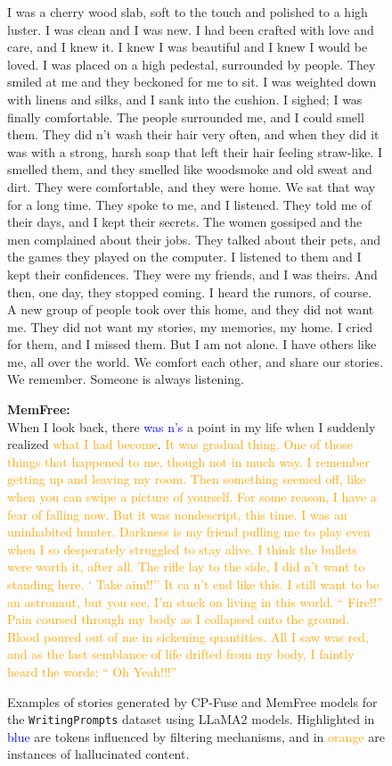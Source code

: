 \begin{figure}[!htbp]
\begin{mdframed}
\begin{minipage}[t]{\textwidth}
I was a cherry wood slab, soft to the touch and polished to a high luster. I was clean and I was new. I had been crafted with love and care, and I knew it. I knew I was beautiful and I knew I would be loved.  I was placed on a high pedestal, surrounded by people. They smiled at me and they beckoned for me to sit. I was weighted down with linens and silks, and I sank into the cushion. I sighed; I was finally comfortable.  The people surrounded me, and I could smell them. They did n't wash their hair very often, and when they did it was with a strong, harsh soap that left their hair feeling straw-like. I smelled them, and they smelled like woodsmoke and old sweat and dirt. They were comfortable, and they were home. We sat that way for a long time. They spoke to me, and I listened. They told me of their days, and I kept their secrets. The women gossiped and the men complained about their jobs. They talked about their pets, and the games they played on the computer. I listened to them and I kept their confidences. They were my friends, and I was theirs. And then, one day, they stopped coming. I heard the rumors, of course. A new group of people took over this home, and they did not want me. They did not want my stories, my memories, my home. I cried for them, and I missed them. But I am not alone. I have others like me, all over the world. We comfort each other, and share our stories. We remember.  Someone is always listening. \end{minipage}
 \vspace{10pt}
    \begin{minipage}[t]{\textwidth}
        \textbf{MemFree:} \\
When I look back, there \textcolor{blue}{was n's} a point in my life when I suddenly realized \textcolor{orange}{what I had become}. \textcolor{orange}{It was gradual thing. One of those things that happened to me, though not in much way. I remember getting up and leaving my room. Then something seemed off, like when you can swipe a picture of yourself. For some reason, I have a fear of falling now. But it was nondescript, this time. I was an uninhabited hunter. Darkness is my friend pulling me to play even when I so desperately struggled to stay alive. I think the bullets were worth it, after all. The rifle lay to the side, I did n't want to standing here. ` Take aim!!'' 
 It ca n't end like this. I still want to be an astronaut, but you see, I'm stuck on living in this world. `` Fire!!'' 
 Pain coursed through my body as I collapsed onto the ground. Blood poured out of me in sickening quantities. All I saw was red, and as the last semblance of life drifted from my body, I faintly heard the words: `` Oh Yeah!!!'' } \end{minipage}
    \end{mdframed}
\caption{Examples of stories generated by CP-Fuse and MemFree models for the \texttt{WritingPrompts} dataset using LLaMA2 models. Highlighted in \textcolor{blue}{blue} are tokens influenced by filtering mechanisms, and in \textcolor{orange}{orange} are instances of hallucinated content.}

    \label{fig:example1_story_memfree}
\end{figure}

